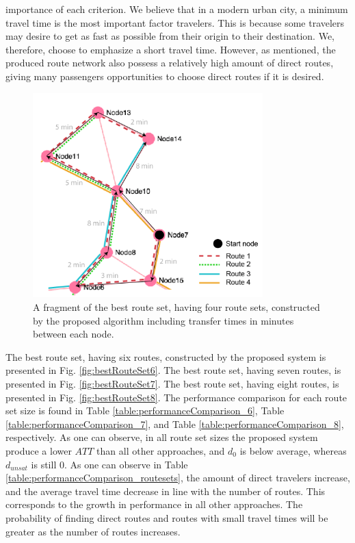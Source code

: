 importance of each criterion. We believe that in a modern urban city, a minimum travel time is the most important factor travelers. This is because some travelers may desire to get as fast as possible from their origin to their destination. We, therefore, choose to emphasize a short travel time. However, as mentioned, the produced route network also possess a relatively high amount of direct routes, giving many passengers opportunities to choose direct routes if it is desired. 

\begin{figure}[H]
    \begin{center}
    \includegraphics[width=3.5in]{assets/mandl_withTT_utsnitt.png}
    \end{center}
    \caption{A fragment of the best route set, having four route sets, constructed by the proposed algorithm including transfer times in minutes between each node.}
    \label{fig:mandlWithTT} 
\end{figure}

The best route set, having six routes, constructed by the proposed system is presented in Fig. \vref{fig:bestRouteSet6}. The best route set, having seven routes, is presented in Fig. \vref{fig:bestRouteSet7}. The best route set, having eight routes, is presented in Fig. \vref{fig:bestRouteSet8}. The performance comparison for each route set size is found in Table \vref{table:performanceComparison_6}, Table \vref{table:performanceComparison_7}, and Table \vref{table:performanceComparison_8}, respectively. As one can observe, in all route set sizes the proposed system produce a lower $ATT$ than all other approaches, and $d_0$ is below average, whereas $d_{unsat}$ is still 0. As one can observe in Table \vref{table:performanceComparison_routesets}, the amount of direct travelers increase, and the average travel time decrease in line with the number of routes. This corresponds to the growth in performance in all other approaches. The probability of finding direct routes and routes with small travel times will be greater as the number of routes increases. 

